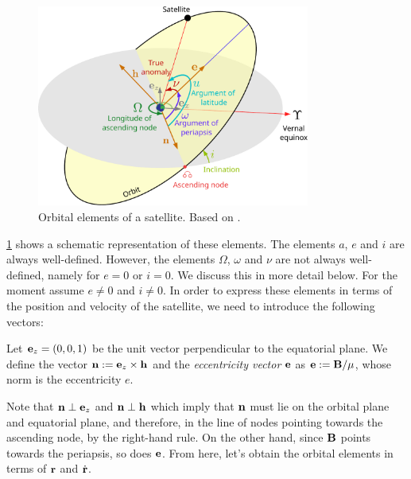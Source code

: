 \documentclass[../main.tex]{subfiles}
\begin{document}
\begin{figure}[ht]
  \centering
  \includegraphics[width=0.8\textwidth]{Images/orbital_elements.pdf}
  \caption{Orbital elements of a satellite. Based on \cite{wiki:orbital-elements}.}
  \label{fig:orbital_elements}
\end{figure}
\cref{fig:orbital_elements} shows a schematic representation of these elements. The elements $a$, $e$ and $i$ are always well-defined. However, the elements $\Omega$, $\omega$ and $\nu$ are not always well-defined, namely for $e=0$ or $i=0$. We discuss this in more detail below. For the moment assume $e\neq 0$ and $i\neq 0$. In order to express these elements in terms of the position and velocity of the satellite, we need to introduce the following vectors:
\begin{definition}
  Let $\boldsymbol{\mathrm{e}}_z=(0,0,1)$ be the unit vector perpendicular to the equatorial plane. We define the vector $\boldsymbol{\mathrm{n}}:=\boldsymbol{\mathrm{e}}_z\times \boldsymbol{\mathrm{h}}$ and the \emph{eccentricity vector} $\boldsymbol{\mathrm{e}}$ as $\boldsymbol{\mathrm{e}}:=\boldsymbol{\mathrm{B}}/\mu$, whose norm is the eccentricity $e$.
\end{definition}
Note that $\boldsymbol{\mathrm{n}}\perp \boldsymbol{\mathrm{e}}_z$ and $\boldsymbol{\mathrm{n}}\perp \boldsymbol{\mathrm{h}}$ which imply that $\boldsymbol{\mathrm{n}}$ must lie on the orbital plane and equatorial plane, and therefore, in the line of nodes pointing towards the ascending node, by the right-hand rule. On the other hand, since $\boldsymbol{\mathrm{B}}$ points towards the periapsis, so does $\boldsymbol{\mathrm{e}}$. From here, let's obtain the orbital elements in terms of $\boldsymbol{\mathrm{r}}$ and $\dot{\boldsymbol{\mathrm{r}}}$.
\end{document}
